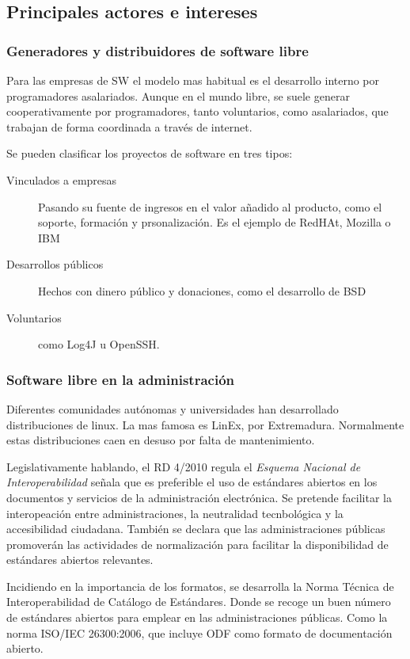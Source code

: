 \subsection{Principales actores e intereses}

    \subsubsection{Generadores y distribuidores de software libre}
        Para las empresas de SW el modelo mas habitual es el desarrollo interno por programadores asalariados. Aunque en el mundo libre, se suele generar cooperativamente por programadores, tanto voluntarios, como asalariados, que trabajan de forma coordinada a través de internet.

        Se pueden clasificar los proyectos de software en tres tipos:

        \begin{description}
            \item[Vinculados a empresas] Pasando su fuente de ingresos en el valor añadido al producto, como el soporte, formación y prsonalización. Es el ejemplo de RedHAt, Mozilla o IBM
            \item[Desarrollos públicos] Hechos con dinero público y donaciones, como el desarrollo de BSD
            \item[Voluntarios] como Log4J u OpenSSH.
        \end{description}

    \subsubsection{Software libre en la administración}
        Diferentes comunidades autónomas y universidades han desarrollado distribuciones de linux. La mas famosa es LinEx, por Extremadura. Normalmente estas distribuciones caen en desuso por falta de mantenimiento.

        Legislativamente hablando, el RD 4/2010 regula el \textit{Esquema Nacional de Interoperabilidad} señala que es preferible el uso de estándares abiertos en los documentos y servicios de la administración electrónica. Se pretende facilitar la interopeación entre administraciones, la neutralidad tecnbológica y la accesibilidad ciudadana. También se declara que las administraciones públicas promoverán las actividades de normalización para facilitar la disponibilidad de estándares abiertos relevantes.

        Incidiendo en la importancia de los formatos, se desarrolla la Norma Técnica de Interoperabilidad de Catálogo de Estándares. Donde se recoge un buen número de estándares abiertos para emplear en las administraciones públicas. Como la norma ISO/IEC 26300:2006, que incluye ODF como formato de documentación abierto. 

